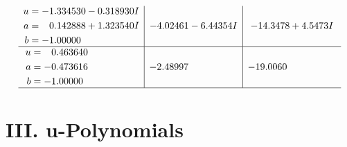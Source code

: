 \documentclass[1p]{elsarticle_modified}
\theoremstyle{definition}
\begin{document}
$$\begin{array}{c|c|c}
\begin{aligned}
u &= -1.334530 - 0.318930 I \\
a &= \phantom{-}0.142888 + 1.323540 I \\
b &= -1.00000\phantom{ +0.000000I}\end{aligned}
 & -4.02461 - 6.44354 I & -14.3478 + 4.5473 I \\ \hline\begin{aligned}
u &= \phantom{-}0.463640\phantom{ +0.000000I} \\
a &= -0.473616\phantom{ +0.000000I} \\
b &= -1.00000\phantom{ +0.000000I}\end{aligned}
 & -2.48997\phantom{ +0.000000I} & -19.0060\phantom{ +0.000000I}\\
 \hline 
 \end{array}$$\newpage
\newpage\renewcommand{\arraystretch}{1}
\centering \section*{ III. u-Polynomials}
\end{document}
